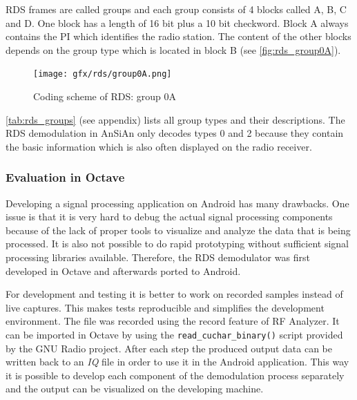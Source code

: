 RDS frames are called groups and each group consists of 4 blocks called
A, B, C and D. One block has a length of 16 bit plus a 10 bit checkword.
Block A always contains the \ac{PI} which identifies the radio station.
The content of the other blocks depends on the group type which is located
in block B (see \autoref{fig:rds_group0A}).

\begin{figure}
	\centering
	\texttt{[image: gfx/rds/group0A.png]}
	\caption[Coding scheme of RDS: group 0A]{Coding scheme of RDS: group 0A \cite{1999:iec62106}}
	\label{fig:rds_group0A}
\end{figure}

\autoref{tab:rds_groups} (see appendix) lists all group types and their descriptions.
The \ac{RDS} demodulation in AnSiAn only decodes types 0 and 2 because they contain
the basic information which is also often displayed on the radio
receiver.


\subsubsection{Evaluation in Octave}

Developing a signal processing application on Android has many drawbacks. One
issue is that it is very hard to debug the actual signal processing components
because of the lack of proper tools to visualize and analyze the data that is
being processed. It is also not possible to do rapid prototyping without
sufficient signal processing libraries available. Therefore, the \ac{RDS}
demodulator was first developed in Octave and afterwards ported to Android.

For development and testing it is better to work on recorded samples instead
of live captures. This makes tests reproducible and simplifies the development
environment. The file was recorded using the record feature of RF Analyzer. It
can be imported in Octave by using the \texttt{read\_cuchar\_binary()} script
provided by the GNU Radio project. After each step the produced output data
can be written back to an \emph{IQ} file in order to use it in the Android application.
This way it is possible to develop each component of the demodulation process
separately and the output can be visualized on the developing machine.

